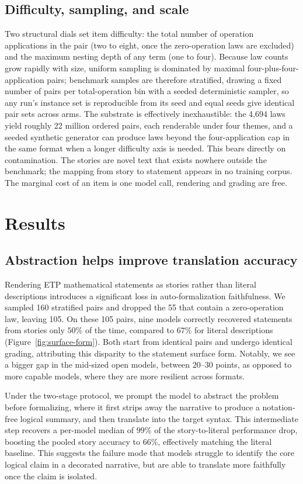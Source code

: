 \documentclass{article}
\begin{document}
\subsection{Difficulty, sampling, and scale}
Two structural dials set item difficulty: the total number of operation
applications in the pair (two to eight, once the zero-operation laws are
excluded) and the maximum nesting depth of any term (one to four). Because
law counts grow rapidly with size, uniform sampling is dominated by
maximal four-plus-four-application pairs; benchmark samples are therefore
stratified, drawing a fixed number of pairs per total-operation bin with a
seeded deterministic sampler, so any run's instance set is reproducible
from its seed and equal seeds give identical pair sets across arms.
The substrate is effectively inexhaustible: the 4{,}694 laws yield roughly
22 million ordered pairs, each renderable under four themes, and a seeded
synthetic generator can produce laws beyond the four-application cap in the
same format when a longer difficulty axis is needed. This bears directly on
contamination. The stories are novel text that exists nowhere outside the
benchmark; the mapping from story to statement appears in no training
corpus. The marginal cost of an item is one model call, rendering and grading are free.

\section{Results}
\label{sec:results}
\subsection{Abstraction helps improve translation accuracy}
Rendering ETP mathematical statements as  stories rather than literal descriptions introduces a significant loss in auto-formalization faithfulness. We sampled 160 stratified pairs and dropped the 55 that contain a zero-operation law, leaving 105. On these 105 pairs, nine models correctly recovered statements from stories only $50\%$ of the time, compared to $67\%$ for literal descriptions (Figure~\ref{fig:surface-form}). Both start from identical pairs and undergo identical grading, attributing this disparity to the statement surface form. Notably, we see a bigger gap in the mid-sized open models, between $20$--$30$ points, as opposed to more capable models, where they are more resilient across formats.

Under the two-stage protocol, we prompt the model to abstract the problem before formalizing, where it first strips away the narrative to produce a notation-free logical summary, and then translate into the target syntax. This intermediate step recovers a per-model median of $99\%$ of the story-to-literal performance drop, boosting the pooled story accuracy to $66\%$, effectively matching the literal baseline. This suggests the failure mode that models struggle to identify the core logical claim in a decorated narrative, but are able to translate more faithfully once the claim is isolated.
\end{document}
